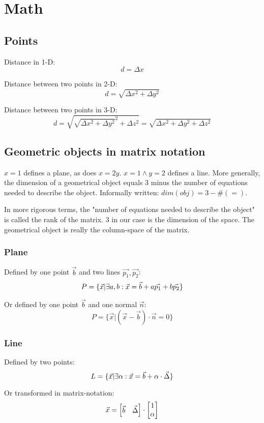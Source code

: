 \section{Math}

\subsection{Points}

Distance in 1-D:
$$ d = \Delta x $$

Distance between two points in 2-D: 
$$ d = \sqrt{\Delta x^2 + \Delta y^2} $$

Distance between two points in 3-D:
$$ d = \sqrt{ \sqrt{\Delta x^2 + \Delta y^2}^2 + \Delta z^2 } = \sqrt{\Delta x^2 + \Delta y^2 + \Delta z^2}$$


\subsection{Geometric objects in matrix notation}

$x=1$ defines a plane, as does $x=2y$. $x=1 \land y=2$ defines a line. 
More generally, the dimension of a geometrical object equals 3 minus the number of equations needed to describe the object.
Informally written: $ dim(obj) = 3 - \#(=) $.

In more rigorous terms, the "number of equations needed to describe the object" is called the rank of the matrix. 3 in our case is the dimension of the space. The geometrical object is really the column-space of the matrix. 


\subsubsection{Plane}

Defined by one point $\vec{b}$ and two lines $\vec{p_1}, \vec{p_2}$: 
$$ P = \{ \vec{x} | \exists a,b:  \vec{x} = \vec{b} + a\vec{p_1} + b\vec{p_2} \} $$

Or defined by one point $\vec{b}$ and one normal $\vec{n}$:
$$ P = \{ \vec{x} | ( \vec{x} - \vec{b} )\cdot \vec{n} = 0 \} $$


\subsubsection{Line}

Defined by two points: 
$$ L = \{ \vec{x} | \exists \alpha:  \vec{x} = \vec{b} + \alpha \cdot \vec{\Delta}  \}$$

Or transformed in matrix-notation:
$$ 
\vec{x} = 
\begin{bmatrix}
    \vec{b} & \vec{\Delta}
\end{bmatrix}
\cdot
 \begin{bmatrix}  1 \\ \alpha  \\ \end{bmatrix} 
$$

